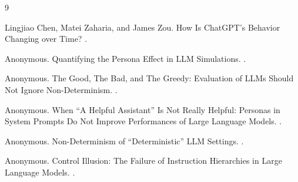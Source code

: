 \documentclass[11pt]{article}
\begin{document}
\begin{thebibliography}{9}

Lingjiao Chen, Matei Zaharia, and James Zou.
\newblock How Is ChatGPT's Behavior Changing over Time?
.

Anonymous.
\newblock Quantifying the Persona Effect in LLM Simulations.
.

Anonymous.
\newblock The Good, The Bad, and The Greedy: Evaluation of LLMs Should Not Ignore Non-Determinism.
.

Anonymous.
\newblock When ``A Helpful Assistant'' Is Not Really Helpful: Personas in System Prompts Do Not Improve Performances of Large Language Models.
.

Anonymous.
\newblock Non-Determinism of ``Deterministic'' LLM Settings.
.

Anonymous.
\newblock Control Illusion: The Failure of Instruction Hierarchies in Large Language Models.
.

\end{thebibliography}
\end{document}
